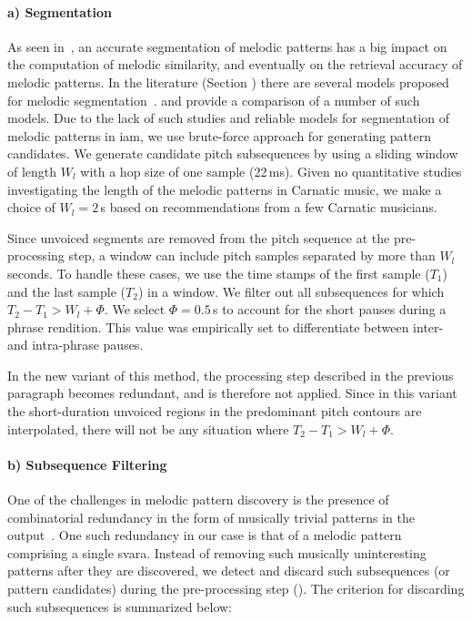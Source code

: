 \paragraph{a) Segmentation} 

As seen in~, an accurate segmentation of melodic patterns has a big impact on the computation of melodic similarity, and eventually on the retrieval accuracy of melodic patterns. In the literature (Section ) there are several models proposed for melodic segmentation~\citep{Cambouropoulos2006,muller2009robust,cambouropoulos2001local}. \cite{pearce2008comparison} and \cite{rodriguez2014comparing} provide a comparison of a number of such models. Due to the lack of such studies and reliable models for segmentation of melodic patterns in \gls{iam}, we use brute-force approach for generating pattern candidates. We generate candidate pitch subsequences by using a sliding window of length $W_l$ with a hop size of one sample (22\,ms). Given no quantitative studies investigating the length of the melodic patterns in Carnatic music, we make a choice of $W_l = 2$\,s based on recommendations from a few Carnatic musicians.

Since unvoiced segments are removed from the pitch sequence at the pre-processing step, a window can include pitch samples separated by more than $W_l$ seconds. To handle these cases, we use the time stamps of the first sample ($T_1$) and the last sample ($T_2$) in a window. We filter out all subsequences for which $T_2-T_1 > W_l + \Phi$. We select $\Phi =0.5$\,s to account for the short pauses during a phrase rendition. This value was empirically set to differentiate between inter- and intra-phrase pauses. 

In the new variant of this method, the processing step described in the previous paragraph becomes redundant, and is therefore not applied. Since in this variant the short-duration unvoiced regions in the predominant pitch contours are interpolated, there will not be any situation where $T_2-T_1 > W_l + \Phi$. 


\paragraph{b) Subsequence Filtering} 

One of the challenges in melodic pattern discovery is the presence of combinatorial redundancy in the form of musically trivial patterns in the output~\citep{Lartillot2005}. One such redundancy in our case is that of a melodic pattern comprising a single \gls{svara}. Instead of removing such musically uninteresting patterns after they are discovered, we detect and discard such subsequences (or pattern candidates) during the pre-processing step (). The criterion for discarding such subsequences is summarized below:

